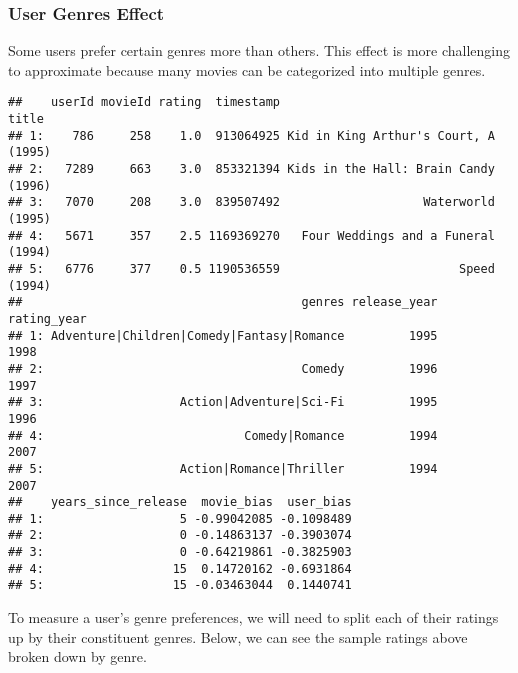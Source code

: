 \documentclass[
]{article}
\newenvironment{Shaded}{\begin{snugshade}}{\end{snugshade}}
\newcommand{\CharTok}[1]{\textcolor[rgb]{0.31,0.60,0.02}{#1}}
\newcommand{\DataTypeTok}[1]{\textcolor[rgb]{0.13,0.29,0.53}{#1}}
\newcommand{\KeywordTok}[1]{\textcolor[rgb]{0.13,0.29,0.53}{\textbf{#1}}}
\newcommand{\NormalTok}[1]{#1}
\newcommand{\OperatorTok}[1]{\textcolor[rgb]{0.81,0.36,0.00}{\textbf{#1}}}
\newcommand{\StringTok}[1]{\textcolor[rgb]{0.31,0.60,0.02}{#1}}
\begin{document}
\hypertarget{user-genres-effect}{%
\subsubsection{User Genres Effect}\label{user-genres-effect}}

Some users prefer certain genres more than others. This effect is more
challenging to approximate because many movies can be categorized into
multiple genres.

\begin{verbatim}
##    userId movieId rating  timestamp                                title
## 1:    786     258    1.0  913064925 Kid in King Arthur's Court, A (1995)
## 2:   7289     663    3.0  853321394 Kids in the Hall: Brain Candy (1996)
## 3:   7070     208    3.0  839507492                    Waterworld (1995)
## 4:   5671     357    2.5 1169369270   Four Weddings and a Funeral (1994)
## 5:   6776     377    0.5 1190536559                         Speed (1994)
##                                       genres release_year rating_year
## 1: Adventure|Children|Comedy|Fantasy|Romance         1995        1998
## 2:                                    Comedy         1996        1997
## 3:                   Action|Adventure|Sci-Fi         1995        1996
## 4:                            Comedy|Romance         1994        2007
## 5:                   Action|Romance|Thriller         1994        2007
##    years_since_release  movie_bias  user_bias
## 1:                   5 -0.99042085 -0.1098489
## 2:                   0 -0.14863137 -0.3903074
## 3:                   0 -0.64219861 -0.3825903
## 4:                  15  0.14720162 -0.6931864
## 5:                  15 -0.03463044  0.1440741
\end{verbatim}

To measure a user's genre preferences, we will need to split each of
their ratings up by their constituent genres. Below, we can see the
sample ratings above broken down by genre.

\begin{Shaded}
\end{Shaded}
\end{document}
